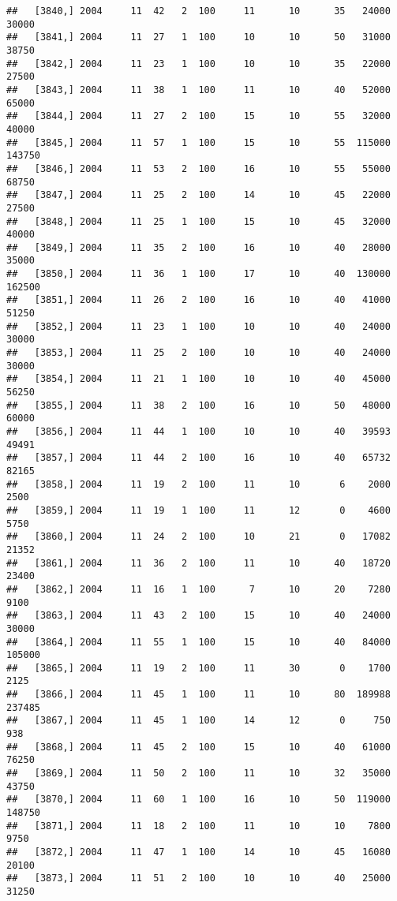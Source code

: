 \documentclass{article}\usepackage[]{graphicx}\usepackage[]{color}
\makeatletter
\newenvironment{kframe}{%
 \def\at@end@of@kframe{}%
 \ifinner\ifhmode%
  \def\at@end@of@kframe{\end{minipage}}%
  \begin{minipage}{\columnwidth}%
 \fi\fi%
 \def\FrameCommand##1{\hskip\@totalleftmargin \hskip-\fboxsep
 \colorbox{shadecolor}{##1}\hskip-\fboxsep
     \hskip-\linewidth \hskip-\@totalleftmargin \hskip\columnwidth}%
 \MakeFramed {\advance\hsize-\width
   \@totalleftmargin\z@ \linewidth\hsize
   \@setminipage}}%
 {\par\unskip\endMakeFramed%
 \at@end@of@kframe}
\newenvironment{knitrout}{}{} %
\makeatother
\begin{document}
\begin{knitrout}
\begin{kframe}
\begin{verbatim}
##   [3840,] 2004     11  42   2  100     11      10      35   24000   30000
##   [3841,] 2004     11  27   1  100     10      10      50   31000   38750
##   [3842,] 2004     11  23   1  100     10      10      35   22000   27500
##   [3843,] 2004     11  38   1  100     11      10      40   52000   65000
##   [3844,] 2004     11  27   2  100     15      10      55   32000   40000
##   [3845,] 2004     11  57   1  100     15      10      55  115000  143750
##   [3846,] 2004     11  53   2  100     16      10      55   55000   68750
##   [3847,] 2004     11  25   2  100     14      10      45   22000   27500
##   [3848,] 2004     11  25   1  100     15      10      45   32000   40000
##   [3849,] 2004     11  35   2  100     16      10      40   28000   35000
##   [3850,] 2004     11  36   1  100     17      10      40  130000  162500
##   [3851,] 2004     11  26   2  100     16      10      40   41000   51250
##   [3852,] 2004     11  23   1  100     10      10      40   24000   30000
##   [3853,] 2004     11  25   2  100     10      10      40   24000   30000
##   [3854,] 2004     11  21   1  100     10      10      40   45000   56250
##   [3855,] 2004     11  38   2  100     16      10      50   48000   60000
##   [3856,] 2004     11  44   1  100     10      10      40   39593   49491
##   [3857,] 2004     11  44   2  100     16      10      40   65732   82165
##   [3858,] 2004     11  19   2  100     11      10       6    2000    2500
##   [3859,] 2004     11  19   1  100     11      12       0    4600    5750
##   [3860,] 2004     11  24   2  100     10      21       0   17082   21352
##   [3861,] 2004     11  36   2  100     11      10      40   18720   23400
##   [3862,] 2004     11  16   1  100      7      10      20    7280    9100
##   [3863,] 2004     11  43   2  100     15      10      40   24000   30000
##   [3864,] 2004     11  55   1  100     15      10      40   84000  105000
##   [3865,] 2004     11  19   2  100     11      30       0    1700    2125
##   [3866,] 2004     11  45   1  100     11      10      80  189988  237485
##   [3867,] 2004     11  45   1  100     14      12       0     750     938
##   [3868,] 2004     11  45   2  100     15      10      40   61000   76250
##   [3869,] 2004     11  50   2  100     11      10      32   35000   43750
##   [3870,] 2004     11  60   1  100     16      10      50  119000  148750
##   [3871,] 2004     11  18   2  100     11      10      10    7800    9750
##   [3872,] 2004     11  47   1  100     14      10      45   16080   20100
##   [3873,] 2004     11  51   2  100     10      10      40   25000   31250

\end{verbatim}
\end{kframe}
\end{knitrout}
\end{document}
